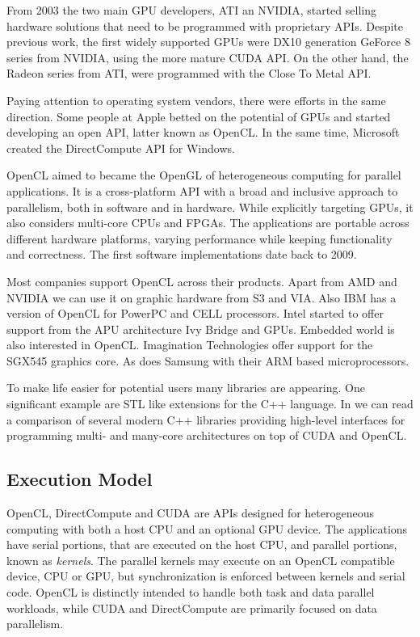 \documentclass[review]{elsarticle}
\begin{document}
From 2003 the two main GPU developers, ATI an NVIDIA, started selling hardware solutions that need to be programmed with proprietary APIs. Despite previous work, the first widely supported GPUs were DX10 generation GeForce 8 series from NVIDIA, using the more mature CUDA API. On the other hand, the Radeon series from ATI, were programmed with the Close To Metal API.

Paying attention to operating system vendors, there were efforts in the same direction. Some people at Apple betted on the potential of GPUs and started developing an open API, latter known as OpenCL. In the same time, Microsoft created the DirectCompute API for Windows.

OpenCL aimed to became the OpenGL of heterogeneous computing for parallel applications. It is a cross-platform API with a broad and inclusive approach to parallelism, both in software and in hardware. While explicitly targeting GPUs, it also considers multi-core CPUs and FPGAs. The applications are portable across different hardware platforms, varying performance while keeping functionality and correctness. The first software implementations date back to 2009.

Most companies support OpenCL across their products. Apart from AMD and NVIDIA we can use it on graphic hardware from S3 and VIA. Also IBM has a version of OpenCL for PowerPC and CELL processors. Intel started to offer support from the APU architecture Ivy Bridge and GPUs. Embedded world is also interested in OpenCL. Imagination Technologies offer support for the SGX545 graphics core. As does Samsung with their ARM based microprocessors.

To make life easier for potential users many libraries are appearing. One significant example are STL like extensions for the C++ language. In \cite{doi:10.1137/120903683} we can read a comparison of several modern C++ libraries providing high-level interfaces for programming multi- and many-core architectures on top of CUDA and OpenCL.

\subsection{Execution Model}

OpenCL, DirectCompute and CUDA are APIs designed for heterogeneous computing with both a host CPU and an optional GPU device. The applications have serial portions, that are executed on the host CPU, and parallel portions, known as \textit{kernels}. The parallel kernels may execute on an OpenCL compatible device, CPU or GPU, but synchronization is enforced between kernels and serial code. OpenCL is distinctly intended to handle both task and data parallel workloads, while CUDA and DirectCompute are primarily focused on data parallelism. 
\end{document}
